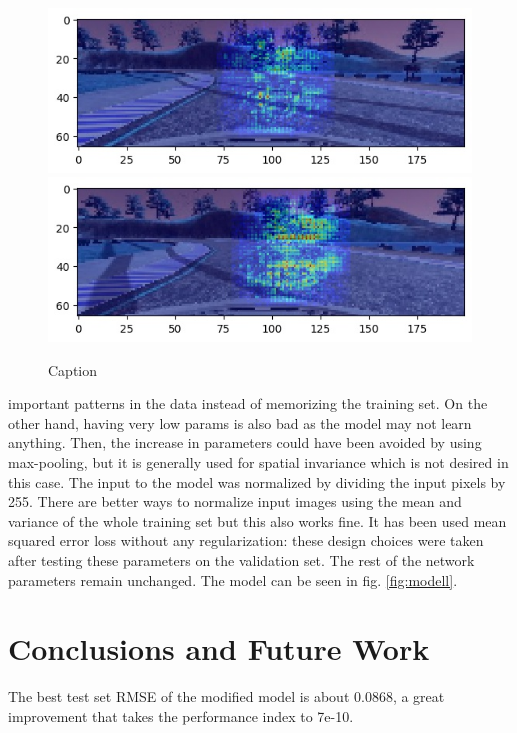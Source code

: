 \documentclass[10pt,twocolumn,letterpaper]{article}
\begin{document}
\begin{figure}[h!]
    \includegraphics[scale=0.33]{2nd-track/yes10-center_2019_04_02_19_35_19_438.jpg} \\
    \includegraphics[scale=0.33]{2nd-track/yes10-center_2019_04_02_19_35_20_131.jpg}
    \caption{Caption}
    \label{fig:track2}
\end{figure}

important patterns in the data instead of memorizing the training set. On the other hand, having very low params is also bad as the model may not learn anything. Then, the increase in parameters could have been avoided by using max-pooling, but it is generally used for spatial invariance which is not desired in this case. The input to the model was normalized by dividing the input pixels by 255. There are better ways to normalize input images using the mean and variance of the whole training set but this also works fine. It has been used mean squared error loss without any regularization: these design choices were taken after testing these parameters on the validation set. The rest of the network parameters remain unchanged. The model can be seen in fig. \ref{fig:modell}.








\section{Conclusions and Future Work}
The best test set RMSE of the modified model is about 0.0868, a great improvement that takes the performance index to 7e-10.
\end{document}
